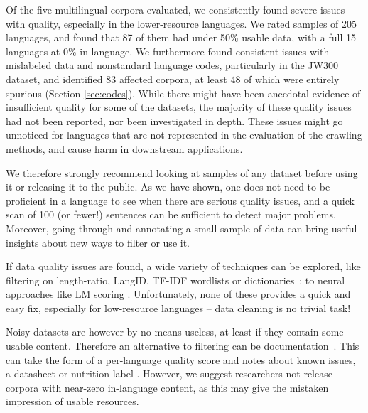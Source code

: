 Of the five multilingual corpora evaluated, we consistently found severe issues with quality, especially in the lower-resource languages. We rated samples of 205 languages, and found that 87 of them had under 50\% usable data, with a full 15 languages at 0\% in-language. We furthermore found consistent issues with mislabeled data and nonstandard language codes, particularly in the JW300 dataset, and identified 83 affected corpora, at least 48 of which were entirely spurious (Section \ref{sec:codes}). While there might have been anecdotal evidence of insufficient quality for some of the datasets, the majority of these quality issues had not been reported, nor been investigated in depth. These issues might go unnoticed for languages that are not represented in the evaluation of the crawling methods, and cause harm in downstream applications.

We therefore strongly recommend looking at samples of any dataset before using it or releasing it to the public. As we have shown, one does not need to be proficient in a language to see when there are serious quality issues, and a quick scan of 100 (or fewer!) sentences can be sufficient to detect major problems. Moreover, going through and annotating a small sample of data can bring useful insights about new ways to filter or use it.

If data quality issues are found, a wide variety of techniques can be explored, like filtering on length-ratio, LangID, TF-IDF wordlists \cite{caswell-etal-2020-language} or dictionaries~\citep{kamholz-etal-2014-panlex}; to neural approaches like LM scoring \cite{axelrod-etal-2011-domain,moore-lewis-2010-intelligent,wang2018denoising}. Unfortunately, none of these provides a quick and easy fix, especially for low-resource languages -- data cleaning is no trivial task!

Noisy datasets are however by no means useless, at least if they contain some usable content. Therefore an alternative to filtering can be documentation~\citep{bender2021dangers}. This can take the form of a per-language quality score and notes about known issues,
a datasheet \citep{gebru2018datasheets} or nutrition label \citep{holland2018dataset}. However, we suggest researchers not release corpora with near-zero in-language content, as this may give the mistaken impression of usable resources.

